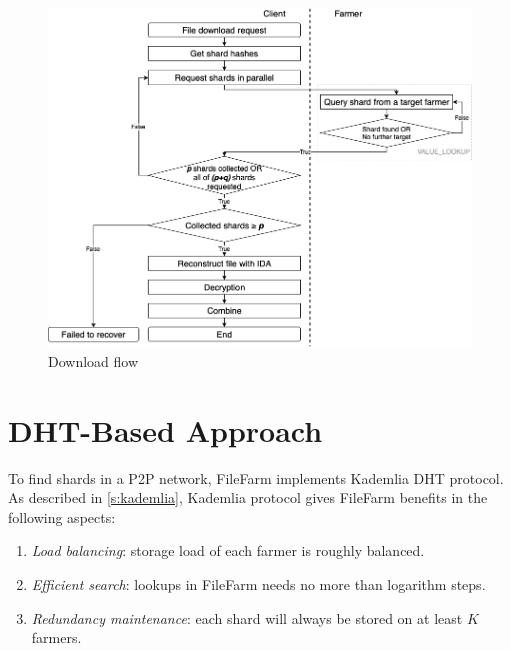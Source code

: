\begin{figure}[!b]
\centering
  \includegraphics[width=15cm]{figures/download_flow.png}
  \caption{Download flow}
  \label{fig:downloadflow}
\end{figure}

\newpage

\section{DHT-Based Approach}
\label{s:dhtbasedapproach}

To find shards in a P2P network, FileFarm implements Kademlia DHT protocol. As described in \ref{s:kademlia}, Kademlia protocol gives FileFarm benefits in the following aspects:

\begin{enumerate}
  \item \textit{Load balancing}: storage load of each farmer is roughly balanced.
  \item \textit{Efficient search}: lookups in FileFarm needs no more than logarithm steps.
  \item \textit{Redundancy maintenance}: each shard will always be stored on at least $K$ farmers.
\end{enumerate}

